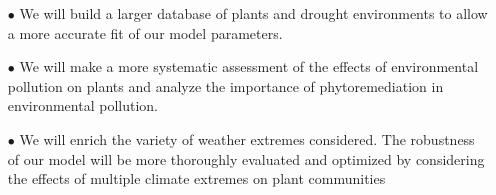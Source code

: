 \documentclass[12pt]{article}  %
\begin{document}
\begin{itemize}

\item[$\bullet$] We will build a larger database of plants and drought environments to allow a more accurate fit of our model parameters.

\item[$\bullet$] We will make a more systematic assessment of the effects of environmental pollution on plants and analyze the importance of phytoremediation in environmental pollution.

\item[$\bullet$] We will enrich the variety of weather extremes considered. The robustness of our model will be more thoroughly evaluated and optimized by considering the effects of multiple climate extremes on plant communities

\end{itemize}
\newpage
\end{document}
